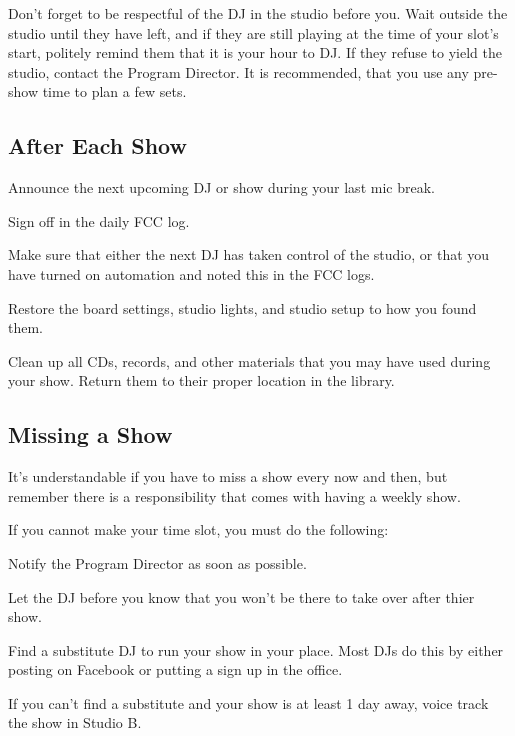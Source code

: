 \documentclass{witrman}
\begin{document}
Don't forget to be respectful of the DJ in the studio before you.  Wait outside
the studio until they have left, and if they are still playing at the time of
your slot's start, politely remind them that it is your hour to DJ\@.  If they
refuse to yield the studio, contact the Program Director.  It is recommended,
that you use any pre-show time to plan a few sets.

\subsection{After Each Show}
\begin{skinnyenumerate}
    \item Announce the next upcoming DJ or show during your last mic break.
    \item Sign off in the daily FCC log.
    \item Make sure that either the next DJ has taken control of the studio, or
        that you have turned on automation and noted this in the FCC logs.
    \item Restore the board settings, studio lights, and studio setup to how you
        found them.
    \item Clean up all CDs, records, and other materials that you may have used
        during your show.  Return them to their proper location in the library.
\end{skinnyenumerate}

\subsection{Missing a Show}

It's understandable if you have to miss a show every now and then, but remember
there is a responsibility that comes with having a weekly show.

If you cannot make your time slot, you must do the following:

\begin{skinnyenumerate}
    \item Notify the Program Director as soon as possible.
    \item Let the DJ before you know that you won't be there to take over after
        thier show.
    \item Find a substitute DJ to run your show in your place.  Most DJs do
        this by either posting on Facebook or putting a sign up in the office.
    \item If you can't find a substitute and your show is at least 1 day away,
        voice track the show in Studio B.
\end{skinnyenumerate}
\end{document}
